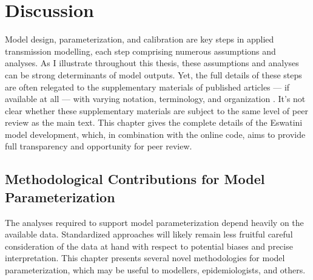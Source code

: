 \section{Discussion}\label{model.disc}
Model design, parameterization, and calibration are key steps in applied transmission modelling,
each step comprising numerous assumptions and analyses.
As I illustrate throughout this thesis,
these assumptions and analyses can be strong determinants of model outputs.
Yet, the full details of these steps
are often relegated to the supplementary materials of published articles --- if available at all ---
with varying notation, terminology, and organization \cite{Delva2012,Knight2022sr}.
It's not clear whether these supplementary materials
are subject to the same level of peer review as the main text.
This chapter gives the complete details of the Eswatini model development, which,
in combination with the online code,
aims to provide full transparency and opportunity for peer review.
\subsection{Methodological Contributions for Model Parameterization}\label{model.disc.par}
The analyses required to support model parameterization depend heavily on the available data.
Standardized approaches will likely remain less fruitful \vs
careful consideration of the data at hand with respect to potential biases and precise interpretation.
This chapter presents several novel methodologies for model parameterization,
which may be useful to modellers, epidemiologists, and others.
